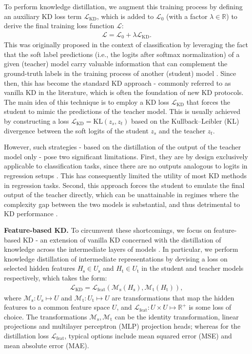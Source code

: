 \documentclass{article}
\newcommand{\loss}{\mathcal{L}}
\newcommand{\R}{\mathbb{R}} %
\begin{document}
To perform knowledge distillation, we augment this training process by defining an auxiliary KD loss term $\loss_{\text{KD}}$, which is added to $\loss_0$ (with a factor $\lambda\in\R$) to derive the final training loss function $\loss$:
\begin{align}
    \loss = \loss_0 + \lambda \loss_{\text{KD}}.
\end{align}
This was originally proposed in the context of classification by leveraging the fact that the soft label predictions (i.e., the logits after softmax normalization) of a given (teacher) model carry valuable information that can complement the ground-truth labels in the training process of another (student) model \cite{hinton_distilling_2015}. Since then, this has become the standard KD approach - commonly referred to as vanilla KD in the literature, which is often the foundation of new KD protocols. The main idea of this technique is to employ a KD loss $\loss_{\text{KD}}$ that forces the student to mimic the predictions of the teacher model. This is usually achieved by constructing a loss $\loss_{\text{KD}} = \text{KL}(z_s, z_t)$ based on the Kullback–Leibler (KL) divergence between the soft logits of the student $z_s$ and the teacher $z_t$.

However, such strategies - based on the distillation of the output of the teacher model only - pose two significant limitations. First, they are by design exclusively applicable to classification tasks, since there are no outputs analogous to logits in regression setups \cite{cheng2018model, saputra2019distilling}. This has consequently limited the utility of most KD methods in regression tasks. Second, this approach forces the student to emulate the final output of the teacher directly, which can be unattainable in regimes where the complexity gap between the two models is substantial, and thus detrimental to KD performance \cite{cho2019efficacy}. 

\textbf{Feature-based KD.}
To circumvent these shortcomings, we focus on feature-based KD - an extension of vanilla KD concerned with the distillation of knowledge across the intermediate layers of models \cite{romero2015fitnets, aguilar2020knowledge, gou2021knowledge}. In particular, we perform knowledge distillation of intermediate representations by devising a loss on selected hidden features $H_\text{s} \in U_\text{s}$ and $H_\text{t} \in U_\text{t}$ in the student and teacher models respectively, which takes the form:
\begin{align}
\label{eq:kd_our}
    \loss_{\text{KD}} = \loss_{\text{feat}}(\mathcal{M}_\text{s}(H_\text{s}), \mathcal{M}_\text{t}(H_\text{t})),
\end{align}
where $\mathcal{M}_\text{s}: U_\text{s} \mapsto  U$ and $\mathcal{M}_\text{t}: U_\text{t} \mapsto U$ are transformations that map the hidden features to a common feature space $U$, and $\loss_{\text{feat}}: U \times U \mapsto \R^+$ is some loss of choice. The transformations $\mathcal{M}_\text{s}, \mathcal{M}_\text{t}$ can be the identity transformation, linear projections and multilayer perceptron (MLP) projection heads; whereas for the distillation loss $\loss_{\text{feat}}$, typical options include mean squared error (MSE) and mean absolute error (MAE). 
\end{document}
